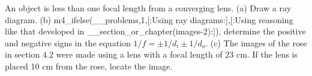 \answercheck An object is less than one focal length from a
converging lens. (a) Draw a ray diagram.
(b) m4_ifelse(__problems,1,[:Using ray diagrams:],[:Using reasoning
like that developed in __section_or_chapter(images-2):]), determine the
positive and negative signs in the equation $1/f=\pm1/d_i\pm1/d_o$. (c) The images
of the rose in section 4.2 were made using a lens with a
focal length of 23 cm. If the lens is placed 10 cm from the
rose, locate the image.
